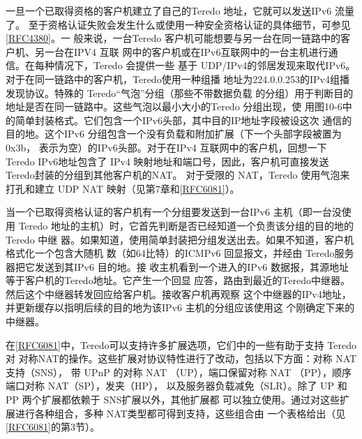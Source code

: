 一旦一个已取得资格的客户机建立了自己的Teredo 地址，它就可以发送IPv6 流量了。
至于资格认证失败会发生什么或使用一种安全资格认证的具体细节，可参见\href{https://www.rfc-editor.org/rfc/rfc4380}{[RFC4380]}。一
般来说，一台Teredo 客户机可能想要与另一台在同一链路中的客户机、另一台在IPV4 互联
网中的客户机或在IPv6互联网中的一台主机进行通信。在每种情况下，Teredo 会提供一些
基于 UDP/IPv4的邻居发现来取代IPv6。对于在同一链路中的客户机，Teredo使用一种组播
地址为224.0.0.253的IPv4组播发现协议。特殊的 Teredo“气泡”分组（那些不带数据负载
的分组）用于判断目的地址是否在同一链路中。这些气泡以最小大小的Teredo 分组出现，使
用图10-6中的简单封装格式。它们包含一个IPv6头部，其中目的IP地址字段被设这次
通信的目的地。这个IPv6 分组包含一个没有负载和附加扩展（下一个头部字段被置为0x3b，
表示为空）的IPv6头部。对于在IPv4 互联网中的客户机，回想一下 Teredo IPv6地址包含了
IPv4 映射地址和端口号，因此，客户机可直接发送Teredo封装的分组到其他客户机的NAT。
对于受限的 NAT，Teredo 使用气泡来打孔和建立 UDP NAT 映射（见第7章和\href{https://www.rfc-editor.org/rfc/rfc6081}{[RFC6081]}）。

当一个已取得资格认证的客户机有一个分组要发送到一台IPv6 主机（即一台没使用
Teredo 地址的主机）时，它首先判断是否已经知道一个负责该分组的目的地的Teredo 中继
器。如果知道，使用简单封装把分组发送出去。如果不知道，客户机格式化一个包含大随机
数（如64比特）的ICMPv6 回显报文，并经由 Teredo服务器把它发送到其IPv6 目的地。接
收主机看到一个进入的IPv6 数据报，其源地址等于客户机的Teredo地址。它产生一个回显
应答，路由到最近的Teredo中继器。然后这个中继器转发回应给客户机。接收客户机再观察
这个中继器的IPv4地址，并更新缓存以指明后续的目的地为该IPv6 主机的分组应该使用这
个刚确定下来的中继器。

在\href{https://www.rfc-editor.org/rfc/rfc6081}{[RFC6081]}中，Teredo可以支持许多扩展选项，它们中的一些有助于支持 Teredo对
对称NAT的操作。这些扩展对协议特性进行了改动，包括以下方面：对称 NAT 支持（SNS），
带 UPnP 的对称 NAT （UP），端口保留对称 NAT （PP），顺序端口对称 NAT（SP），发夹（HP），
以及服务器负载减免（SLR）。除了 UP 和PP 两个扩展都依赖于 SNS扩展以外，其他扩展都
可以独立使用。通过对这些扩展进行各种组合，多种 NAT类型都可得到支持，这些组合由
一个表格给出（见\href{https://www.rfc-editor.org/rfc/rfc6081}{[RFC6081]}的第3节）。


